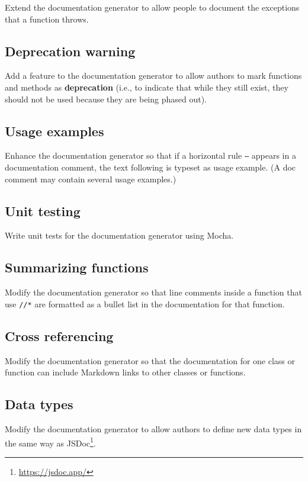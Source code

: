 \documentclass[krantzl]{krantz}
\newcommand{\glossref}[1]{\textbf{#1}}
\newcommand{\hreffoot}[2]{{#1}\footnote{\href{#2}{#2}}}
\begin{document}
Extend the documentation generator to allow people to document the exceptions that a function throws.

\subsection*{Deprecation warning}


Add a feature to the documentation generator
to allow authors to mark functions and methods as \glossref{deprecation}
(i.e., to indicate that while they still exist,
they should not be used because they are being phased out).

\subsection*{Usage examples}


Enhance the documentation generator so that
if a horizontal rule \texttt{---} appears in a documentation comment,
the text following is typeset as usage example.
(A doc comment may contain several usage examples.)

\subsection*{Unit testing}


Write unit tests for the documentation generator using Mocha.

\subsection*{Summarizing functions}


Modify the documentation generator so that line comments inside a function that use \texttt{//*}
are formatted as a bullet list in the documentation for that function.

\subsection*{Cross referencing}


Modify the documentation generator so that
the documentation for one class or function
can include Markdown links to other classes or functions.

\subsection*{Data types}


Modify the documentation generator to allow authors to define new data types
in the same way as \hreffoot{JSDoc}{https://jsdoc.app/}.
\end{document}
